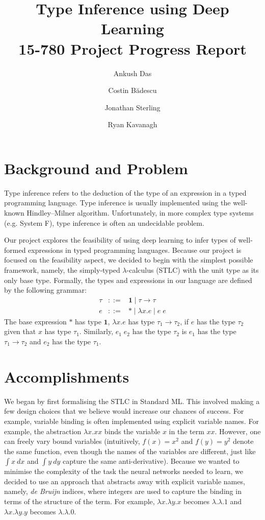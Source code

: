 \documentclass{amsart}
\title{Type Inference using Deep Learning\\15-780 Project Progress Report}
\author{Ankush Das}
\author{Costin B\u{a}descu}
\author{Jonathan Sterling}
\author{Ryan Kavanagh}
\begin{document}
\maketitle

\section{Background and Problem}
Type inference refers to the deduction of the type of an expression in a
typed programming language. Type inference is usually implemented
using the well-known Hindley--Milner algorithm.
Unfortunately, in more complex type systems (e.g. System
F), type inference is often an undecidable
problem.

Our project explores the feasibility of using deep learning to infer
types of well-formed expressions in typed programming languages. Because
our project is focused on the feasibility aspect, we decided to begin
with the simplest possible framework, namely, the simply-typed
$\lambda$-calculus (STLC) with the unit type as its only base
type. Formally, the types and expressions in our language are defined by
the following grammar:
\begin{eqnarray*}
\tau & ::= & \mathbf{1} \mid \tau \to \tau \\
e & ::= & * \mid \lambda x. e \mid e \; e
\end{eqnarray*}
The base expression $*$ has type $\mathbf{1}$, $\lambda x. e$ has type
$\tau_1 \to \tau_2$, if $e$ has the type $\tau_2$ given that $x$ has type
$\tau_1$. Similarly, $e_1 \; e_2$ has the type $\tau_2$ is $e_1$ has the
type $\tau_1 \to \tau_2$ and $e_2$ has the type $\tau_1$.

\section{Accomplishments}

We began by first formalising the STLC in Standard ML. This involved
making a few design choices that we believe would increase our chances
of success. For example, variable binding is often implemented using
explicit variable names. For example, the abstraction $\lambda x. xx$
binds the variable $x$ in the term $xx$. However, one can freely vary
bound variables (intuitively, $f(x) = x^2$ and $f(y) = y^2$ denote the
same function, even though the names of the variables are different,
just like $\int x\ dx$ and $\int y\ dy$ capture the same
anti-derivative). Because we wanted to minimise the complexity of the
task the neural networks needed to learn, we decided to use an
approach that abstracts away with explicit variable names, namely,
\textit{de Bruijn} indices, where integers are used to capture the
binding in terms of the structure of the term. For example,
$\lambda x.\lambda y.x$ becomes $\lambda.\lambda.1$ and
$\lambda x.\lambda y.y$ becomes $\lambda . \lambda . 0$.
\end{document}
